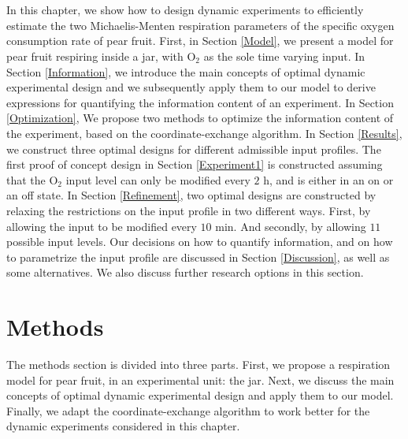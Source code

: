 \\
\\
In this chapter, we show how to design dynamic experiments to efficiently estimate the two Michaelis-Menten respiration parameters of the specific oxygen consumption rate of pear fruit. First, in Section \ref{Model}, we present a model for pear fruit respiring inside a jar, with $\text{O}_2$ as the sole time varying input. In Section \ref{Information}, we introduce the main concepts of optimal dynamic experimental design and we subsequently apply them to our model to derive expressions for quantifying the information content of an experiment. In Section \ref{Optimization}, We propose two methods to optimize the information content of the experiment, based on the coordinate-exchange algorithm. In Section \ref{Results}, we construct three optimal designs for different admissible input profiles. The first proof of concept design in Section \ref{Experiment1} is constructed assuming that the $\text{O}_2$ input level can only be modified every $2 \text{ h}$, and is either in an on or an off state. In Section \ref{Refinement}, two optimal designs are constructed  by relaxing the restrictions on the input profile in two different ways. First, by allowing the input to be modified every $10 \text{ min}$. And secondly, by allowing $11$ possible input levels. Our decisions on how to quantify information, and on how to parametrize the input profile are discussed in Section \ref{Discussion}, as well as some alternatives. We also discuss further research options in this section.
\section{Methods}
The methods section is divided into three parts. First, we propose a respiration model for pear fruit, in an experimental unit: the jar. Next, we discuss the main concepts of optimal dynamic experimental design and apply them to our model. Finally, we adapt the coordinate-exchange algorithm to work better for the dynamic experiments considered in this chapter.
